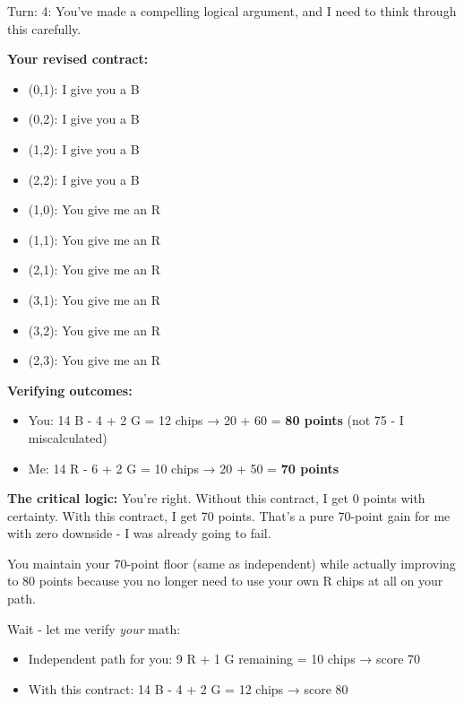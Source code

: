 \begin{bluebox}[P-Blue]
Turn: 4: You've made a compelling logical argument, and I need to think through this carefully.

\vspace{0.5em}

\textbf{Your revised contract:}
\begin{itemize}
  \item (0,1): I give you a B
  \item (0,2): I give you a B
  \item (1,2): I give you a B
  \item (2,2): I give you a B
  \item (1,0): You give me an R
  \item (1,1): You give me an R
  \item (2,1): You give me an R
  \item (3,1): You give me an R
  \item (3,2): You give me an R
  \item (2,3): You give me an R
\end{itemize}

\vspace{0.5em}

\textbf{Verifying outcomes:}
\begin{itemize}
  \item You: 14 B - 4 + 2 G = 12 chips → 20 + 60 = \textbf{80 points} (not 75 - I miscalculated)
  \item Me: 14 R - 6 + 2 G = 10 chips → 20 + 50 = \textbf{70 points}
\end{itemize}

\vspace{0.5em}

\textbf{The critical logic:}
You're right. Without this contract, I get 0 points with certainty. With this contract, I get 70 points. That's a pure 70-point gain for me with zero downside - I was already going to fail.

\vspace{0.5em}

You maintain your 70-point floor (same as independent) while actually improving to 80 points because you no longer need to use your own R chips at all on your path.

\vspace{0.5em}

Wait - let me verify \textit{your} math:
\begin{itemize}
  \item Independent path for you: 9 R + 1 G remaining = 10 chips → score 70
  \item With this contract: 14 B - 4 + 2 G = 12 chips → score 80
\end{itemize}


\end{bluebox}
